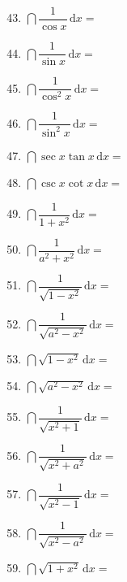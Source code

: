 \documentclass[a4paper,12pt]{article}
\begin{document}
    \begin{minipage}[t]{0.30\textwidth}
        \begin{enumerate}[leftmargin=*, itemsep=1.1em]
            \setcounter{enumi}{42}
            \item $\dint \dfrac{1}{\cos x}\,\mathrm{d}x =$
            \item $\dint \dfrac{1}{\sin x}\,\mathrm{d}x =$
            \item $\dint \dfrac{1}{\cos^2 x}\,\mathrm{d}x =$
            \item $\dint \dfrac{1}{\sin^2 x}\,\mathrm{d}x =$
            \item $\dint \sec x \tan x\,\mathrm{d}x =$
            \item $\dint \csc x \cot x\,\mathrm{d}x =$
            \item $\dint \dfrac{1}{1 + x^2}\,\mathrm{d}x =$
            \item $\dint \dfrac{1}{a^2 + x^2}\,\mathrm{d}x =$
            \item $\dint \dfrac{1}{\sqrt {1 - x^2}}\,\mathrm{d}x =$
            \item $\dint \dfrac{1}{\sqrt {a^2 - x^2}}\,\mathrm{d}x =$
            \item $\dint \sqrt {1 - x^2}\,\mathrm{d}x =$
            \item $\dint \sqrt {a^2 - x^2}\,\mathrm{d}x =$
            \item $\dint \dfrac{1}{\sqrt {x^2 + 1}}\,\mathrm{d}x =$
            \item $\dint \dfrac{1}{\sqrt {x^2 + a^2}}\,\mathrm{d}x =$
            \item $\dint \dfrac{1}{\sqrt {x^2 - 1}}\,\mathrm{d}x =$
            \item $\dint \dfrac{1}{\sqrt {x^2 - a^2}}\,\mathrm{d}x =$
            \item $\dint \sqrt{1+x^2}\,\mathrm{d}x =$
        \end{enumerate}
    \end{minipage}

    \newpage
\end{document}
